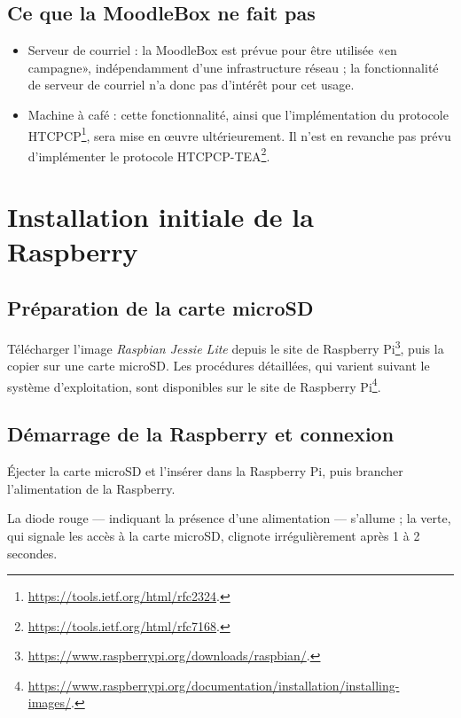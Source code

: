 \documentclass[11pt]{article}
\begin{document}
\subsection{Ce que la MoodleBox ne fait pas}

\begin{itemize}
\item Serveur de courriel : la MoodleBox est prévue pour être utilisée «en campagne», indépendamment d'une infrastructure réseau ; la fonctionnalité de serveur de courriel n'a donc pas d'intérêt pour cet usage.
\item Machine à café : cette fonctionnalité, ainsi que l'implémentation du protocole HTCPCP\footnote{\url{https://tools.ietf.org/html/rfc2324}.}, sera mise en œuvre ultérieurement. Il n'est en revanche pas prévu d'implémenter le protocole HTCPCP-TEA\footnote{\url{https://tools.ietf.org/html/rfc7168}.}.
\end{itemize}


\section{Installation initiale de la Raspberry}

\subsection{Préparation de la carte microSD}

Télécharger l'image \emph{Raspbian Jessie Lite} depuis le site de Raspberry Pi\footnote{\url{https://www.raspberrypi.org/downloads/raspbian/}.}, puis la copier sur une carte microSD. Les procédures détaillées, qui varient suivant le système d'exploitation, sont disponibles sur le site de Raspberry Pi\footnote{\url{https://www.raspberrypi.org/documentation/installation/installing-images/}.}.

\subsection{Démarrage de la Raspberry et connexion}

Éjecter la carte microSD et l'insérer dans la Raspberry Pi, puis brancher l'alimentation de la Raspberry.

\begin{verification}
La diode rouge — indiquant la présence d'une alimentation — s'allume ; la verte, qui signale les accès à la carte microSD, clignote irrégulièrement après 1 à 2 secondes.
\end{verification}
\end{document}
